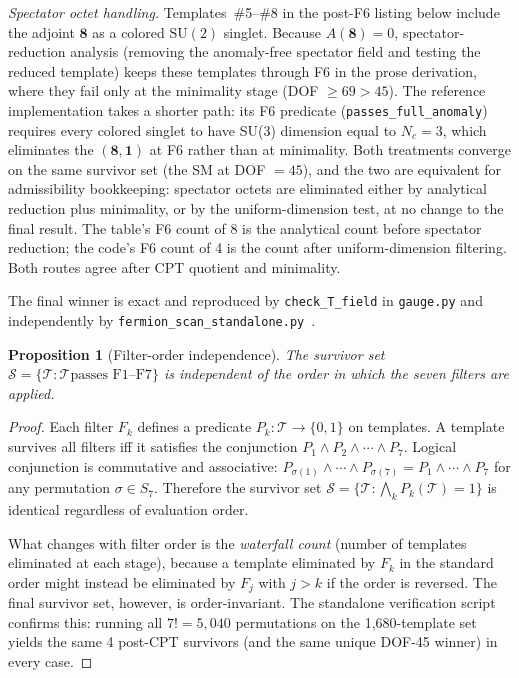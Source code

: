 \documentclass[11pt,a4paper]{article}
\newtheorem{proposition}[theorem]{Proposition}
\theoremstyle{definition}
\newcommand{\SU}{\mathrm{SU}}
\begin{document}
\smallskip\noindent\textit{Spectator octet handling.}\quad
Templates~\#5--\#8 in the post-F6 listing below include the adjoint
$\mathbf{8}$ as a colored $\SU(2)$ singlet.  Because $A(\mathbf{8}) = 0$,
spectator-reduction analysis (removing the anomaly-free spectator field
and testing the reduced template) keeps these templates through F6 in
the prose derivation, where they fail only at the minimality stage
(DOF $\ge 69 > 45$).  The reference implementation takes a shorter
path: its F6 predicate (\texttt{passes\_full\_anomaly}) requires every
colored singlet to have SU(3) dimension equal to $N_c = 3$, which
eliminates the $(\mathbf{8},\mathbf{1})$ at F6 rather than at minimality.
Both treatments converge on the same survivor set (the SM at DOF $= 45$),
and the two are equivalent for admissibility bookkeeping: spectator
octets are eliminated either by analytical reduction plus minimality,
or by the uniform-dimension test, at no change to the final result.
The table's F6 count of 8 is the analytical count before spectator
reduction; the code's F6 count of 4 is the count after uniform-dimension
filtering.  Both routes agree after CPT quotient and minimality.

\smallskip\noindent The final winner is exact and reproduced by
\texttt{check\_T\_field} in \texttt{gauge.py} and independently by
\texttt{fermion\_scan\_standalone.py}~\cite{BrookeFermionScan}.

\begin{proposition}[Filter-order independence]\label{prop:filter_order}
The survivor set $\mathcal{S} = \{\mathcal{T} : \mathcal{T} \text{
passes F1--F7}\}$ is independent of the order in which the seven
filters are applied.
\end{proposition}

\begin{proof}
Each filter $F_k$ defines a predicate $P_k: \mathcal{T} \to
\{0, 1\}$ on templates.  A template survives all filters iff it
satisfies the conjunction $P_1 \wedge P_2 \wedge \cdots \wedge P_7$.
Logical conjunction is commutative and associative:
$P_{\sigma(1)} \wedge \cdots \wedge P_{\sigma(7)} = P_1 \wedge
\cdots \wedge P_7$ for any permutation $\sigma \in S_7$.  Therefore
the survivor set $\mathcal{S} = \{\mathcal{T} : \bigwedge_k
P_k(\mathcal{T}) = 1\}$ is identical regardless of evaluation order.

What changes with filter order is the \emph{waterfall count} (number
of templates eliminated at each stage), because a template eliminated
by $F_k$ in the standard order might instead be eliminated by
$F_j$ with $j > k$ if the order is reversed.  The final survivor
set, however, is order-invariant.  The standalone verification
script confirms this: running all $7! = 5{,}040$ permutations on
the 1{,}680-template set yields the same 4 post-CPT survivors (and
the same unique DOF-45 winner) in every case.
\end{proof}
\end{document}
